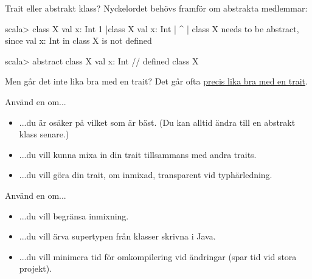 
\begin{Slide}{Trait eller abstrakt klass?}\SlideFontSmall
Nyckelordet  behövs framför  om abstrakta medlemmar:
\begin{REPLsmall}
scala> class X { val x: Int }
1 |class X { val x: Int }
  |      ^
  |      class X needs to be abstract, since val x: Int in class X is not defined 

scala> abstract class X { val x: Int }
// defined class X
\end{REPLsmall}  
Men går det inte lika bra med en trait? \pause Det går ofta \href{https://youtu.be/aFmIS5qeetA?t=221}{precis lika bra med en trait}.

\label{slideW07:traitorclass}
\begin{multicols}{2}
\noindent Använd en  om...
\begin{itemize}
\item ...du är osäker på vilket som är bäst. (Du kan alltid ändra till en abstrakt klass senare.)
\item ...du vill kunna mixa in din trait tillsammans med andra traits.
\item ...du vill göra din trait, om inmixad, transparent vid typhärledning.

\end{itemize}

\columnbreak

\noindent Använd en  om...
\begin{itemize}
\item ...du vill begränsa inmixning. 
\item ...du vill ärva supertypen från klasser skrivna i Java.
\item ...du vill minimera tid för omkompilering vid ändringar (spar tid vid stora projekt).
\end{itemize}


\end{multicols}
\end{Slide}



